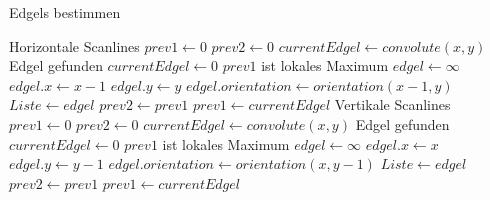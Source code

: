 \begin{algorithm}
	\caption{Edgels bestimmen}
	\label{src:analyseFindedgels}
	\begin{algorithmic}[1]
			\Comment Horizontale Scanlines
				\State $prev1 \gets 0$
				\State $prev2 \gets 0$
					\State $currentEdgel \gets convolute(x, y)$
						\Comment Edgel gefunden
					\Else
						\State $currentEdgel \gets 0$
					\EndIf 
						\Comment $prev1$ ist lokales Maximum
						\State $edgel \gets \infty$
						\State $edgel.x \gets x - 1$
						\State $edgel.y \gets y$
						\State $edgel.orientation \gets orientation(x - 1, y)$
						\State $Liste \gets edgel$
					\EndIf
					\State $prev2 \gets prev1$
					\State $prev1 \gets currentEdgel$
				\EndFor
			\EndFor
			\Statex
			\Comment Vertikale Scanlines
				\State $prev1 \gets 0$
				\State $prev2 \gets 0$
					\State $currentEdgel \gets convolute(x,y)$
						\Comment Edgel gefunden
					\Else
						\State $currentEdgel \gets 0$
					\EndIf
						\Comment $prev1$ ist lokales Maximum
						\State $edgel \gets \infty$
						\State $edgel.x \gets x$
						\State $edgel.y \gets y - 1$
						\State $edgel.orientation \gets orientation(x, y - 1)$
						\State $Liste \gets edgel$
					\EndIf
					\State $prev2 \gets prev1$
					\State $prev1 \gets currentEdgel$
				\EndFor
			\EndFor
		\EndProcedure
	\end{algorithmic}
\end{algorithm}
